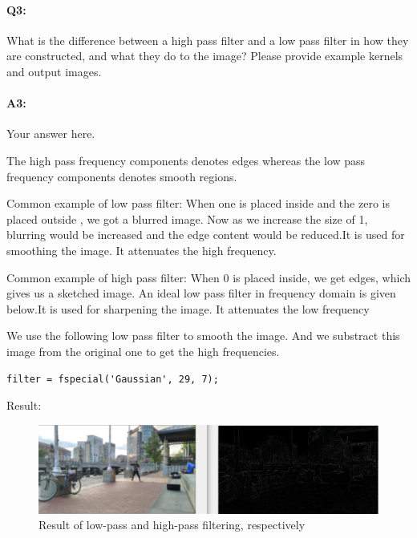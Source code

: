 	
	
	
	\pagebreak
	\paragraph{Q3:} What is the difference between a high pass filter and a low pass filter in how they are constructed, and what they do to the image? Please provide example kernels and output images.
	
	\paragraph{A3:} Your answer here.
	
	The high pass frequency components denotes edges whereas the low pass frequency components denotes smooth regions.
	
	Common example of low pass filter: When one is placed inside and the zero is placed outside , we got a blurred image. Now as we increase the size of 1, blurring would be increased and the edge content would be reduced.It is used for smoothing the image. It attenuates the high frequency.
	
	Common example of high pass filter: When 0 is placed inside, we get edges, which gives us a sketched image. An ideal low pass filter in frequency domain is given below.It is used for sharpening the image. It attenuates the low frequency 
	
	We use the following low pass filter to smooth the image. And we substract this image from the original one to get the high frequencies.
	
	\begin{lstlisting}[style=Matlab-editor]
    filter = fspecial('Gaussian', 29, 7);
    \end{lstlisting}
    
    Result: 
    
    \begin{figure}[htp]
    \centering
    \includegraphics[width=15cm]{questions/nenene.PNG}
    \caption{Result of low-pass and high-pass filtering, respectively}
    \label{fig:einstein}
    \end{figure}
	
